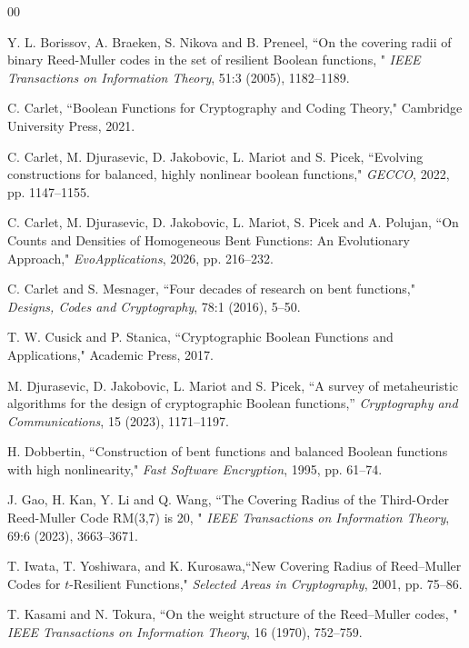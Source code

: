 \documentclass[11pt]{article}
\newtheorem{open problem}{Open problem}
\begin{document}
\begin{thebibliography}{00}



 Y. L. Borissov, A. Braeken, S. Nikova and B. Preneel, ``On the covering radii of binary Reed-Muller codes in the set of resilient Boolean functions, " \emph{IEEE Transactions on Information Theory}, 51:3 (2005), 1182--1189.

 C. Carlet, ``Boolean Functions for Cryptography and Coding Theory," Cambridge University Press, 2021.

	C. Carlet, M. Djurasevic, D. Jakobovic, L. Mariot and S. Picek, ``Evolving constructions for balanced, highly nonlinear boolean functions," \emph{GECCO}, 2022, pp. 1147--1155.
	
	C. Carlet, M. Djurasevic, D. Jakobovic, L. Mariot, S. Picek and A. Polujan, ``On Counts and Densities of Homogeneous Bent Functions: An Evolutionary Approach," \emph{EvoApplications}, 2026, pp. 216--232.

	C. Carlet and S. Mesnager, ``Four decades of research on bent functions," \emph{Designs, Codes and Cryptography}, 78:1 (2016), 5--50.

 T. W. Cusick and P. Stanica, ``Cryptographic Boolean Functions and Applications," Academic Press, 2017.

  M. Djurasevic, D. Jakobovic, L. Mariot and S. Picek, ``A survey of metaheuristic algorithms for the design of cryptographic Boolean functions,''  \emph{Cryptography and Communications}, 15 (2023), 1171--1197.

 H. Dobbertin, ``Construction of bent functions and balanced Boolean functions with high nonlinearity," \emph{Fast Software Encryption}, 1995, pp. 61--74.

 J. Gao, H. Kan, Y. Li and Q. Wang,  ``The Covering Radius of the Third-Order
Reed-Muller Code RM(3,7) is 20, " \emph{IEEE Transactions on Information Theory}, 69:6 (2023), 3663--3671.

 T. Iwata, T. Yoshiwara, and K. Kurosawa,``New Covering Radius of Reed--Muller Codes
for $t$-Resilient Functions," \emph{Selected Areas in Cryptography}, 2001, pp. 75--86.

 T. Kasami and N. Tokura, ``On the weight structure of the Reed--Muller
codes, " \emph{IEEE Transactions on Information Theory}, 16 (1970), 752--759.


\end{thebibliography}
\end{document}
